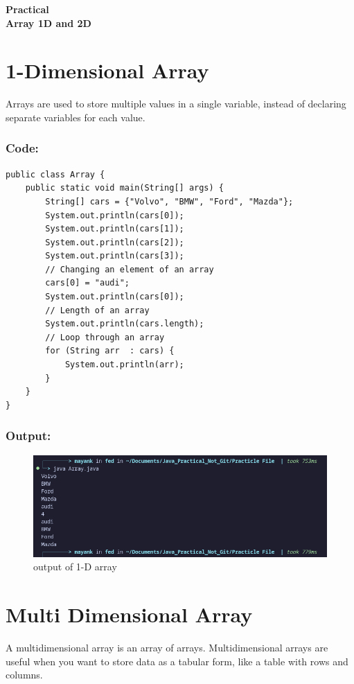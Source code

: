 \documentclass[a4paper,12pt]{article}
\newcounter{practicalno} %
\newcommand{\practicaltitle}[1]{
    \stepcounter{practicalno} %
    \newpage
    \begin{center}
        \vspace{1cm}
        \Large\textbf{Practical \thepracticalno} \\
        \vspace{0.5cm}
        \Large\textbf{#1} %
        \normalsize\vspace{1cm}
    \end{center}
}
\begin{document}
\setcounter{section}{0}

\practicaltitle{Array 1D and 2D}

\section{1-Dimensional Array}
Arrays are used to store multiple values in a single variable, instead of declaring separate variables for each value.
\subsubsection{Code: }
\begin{lstlisting}
public class Array {
    public static void main(String[] args) {
        String[] cars = {"Volvo", "BMW", "Ford", "Mazda"};
        System.out.println(cars[0]); 
        System.out.println(cars[1]); 
        System.out.println(cars[2]); 
        System.out.println(cars[3]); 
        // Changing an element of an array
        cars[0] = "audi";
        System.out.println(cars[0]); 
        // Length of an array
        System.out.println(cars.length);
        // Loop through an array
        for (String arr  : cars) {
            System.out.println(arr);
        }
    }
}  
\end{lstlisting}
\subsubsection{Output: }
\begin{figure}[H]
    \centering
    \includegraphics[width=0.9\linewidth]{images/output2.png}
    \caption{output of 1-D array}
    \label{fig:sample_image}
\end{figure}

\section{Multi Dimensional Array}
A multidimensional array is an array of arrays. Multidimensional arrays are useful when you want to store data as a tabular form, like a table with rows and columns.
\end{document}
